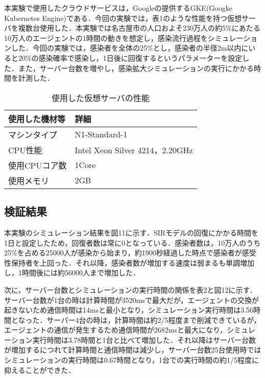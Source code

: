 \documentclass[originalpaper]{jsaiart}     %
\begin{document}
本実験で使用したクラウドサービスは，Googleの提供するGKE(Googke Kubernetes Engine)である．今回の実験では，表1のような性能を持つ仮想サーバを複数台使用した．本実験では名古屋市の人口およそ230万人の約5\%にあたる10万人のエージェントの1時間の動きを想定し，感染流行過程をシミュレーションした．今回の実験では，感染者を全体の25\%とし，感染者の半径2m以内にいると20\%の感染確率で感染し，1日後に回復するというパラメーターを設定した．また，サーバー台数を増やし，感染拡大シミュレーションの実行にかかる時間を計測した．

\begin{table}[t]
	\begin{center}
	  \caption{使用した仮想サーバの性能}
	  \begin{tabular}{|l|l|} \hline
		使用した機材等 & 詳細 \\\hline
        マシンタイプ & N1-Standard-1 \\
        CPU性能 & Intel Xeon Silver 4214，2.20GHz \\
        使用CPUコア数 & 1Core \\
        使用メモリ & 2GB \\ \hline
	 \end{tabular}
	  \label{tab:environment}
	\end{center}
  \end{table}

\subsection{検証結果}
本実験のシミュレーション結果を図11に示す．SIRモデルの回復にかかる時間を1日と設定したため，回復者数は常に0となっている．感染者数は，10万人のうち25\%を占める25000人が感染から始まり，約1900秒経過した時点で感染者が感受性保持者を上回った．それ以降，感染者数が増加する速度は弱まるも単調増加し，1時間後には約56000人まで増加した．

次に，サーバー台数とシミュレーションの実行時間の関係を表2と図12に示す．サーバー台数が1台の時は計算時間が3520msで最大だが，エージェントの交換が起きないため通信時間は14msと最小となり，シミュレーション実行時間は3.56時間となった．サーバー4台の時は，計算時間は約2/5程度まで削減できているが，エージェントの通信が発生するため通信時間が2682msと最大になり，シミュレーション実行時間は3.78時間と1台と比べて増加した．それ以降はサーバー台数が増加するにつれて計算時間と通信時間は減少し，サーバー台数25台使用時ではシミュレーションの実行時間は0.67時間となり，1台での実行時間の約1/5程度に抑えることができた．
\end{document}
